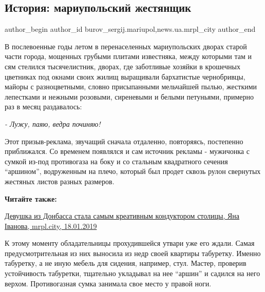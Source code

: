  
 
 
 
 
 
\subsection{История: мариупольский жестянщик}
\label{sec:19_01_2019.stz.news.ua.mrpl_city.2.istoria_mariupolskij_zhestjanschik}
 
\ifcmt
 author_begin
   author_id burov_sergij.mariupol,news.ua.mrpl_city
 author_end
\fi


В послевоенные годы летом в перенаселенных мариупольских дворах старой части
города, мощенных грубыми плитами известняка, между которыми там и сям стелился
тысячелистник, дворах, где заботливые хозяйки в крошечных цветниках под окнами
своих жилищ выращивали бархатистые чернобривцы, майоры с разноцветными, словно
присыпанными мельчайшей пылью, жесткими лепестками и нежными розовыми,
сиреневыми и белыми петуньями, примерно раз в месяц раздавалось:

\emph{- Лужу, паяю, ведра починяю!}

Этот призыв-реклама, звучащий сначала отдаленно, повторяясь, постепенно
приближался. Со временем появлялся и сам источник рекламы - мужичонка с сумкой
из-под противогаза на боку и со стальным квадратного сечения \enquote{аршином},
водруженным на плечо, который был продет сквозь рулон свернутых жестяных листов
разных размеров.

\textbf{Читайте также:} 

\href{https://mrpl.city/news/view/devushka-iz-donbassa-stala-samym-kreativnym-konduktorom-stolitsy-foto}{%
Девушка из Донбасса стала самым креативным кондуктором столицы, Яна Іванова, mrpl.city, 18.01.2019}

К этому моменту обладательницы прохудившейся утвари уже его ждали. Самая
предусмотрительная из них выносила из недр своей квартиры табуретку. Именно
табуретку, а не иную мебель для сидения, например, стул. Мастер, проверив
устойчивость табуретки, тщательно укладывал на нее \enquote{аршин} и садился на него
верхом. Противогазная сумка занимала свое место у правой ноги.

